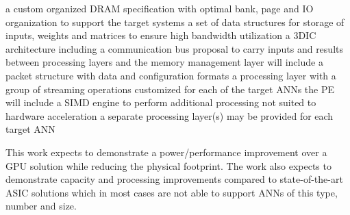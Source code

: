 \begin{outline}
\renewcommand{\outlinei}{enumerate}
  \vspace{-3mm}
  \1 a custom organized DRAM specification with optimal bank, page and IO organization to support the target systems
  \vspace{-3mm}
  \1 a set of data structures for storage of inputs, weights and matrices to ensure high bandwidth utilization
  \vspace{-3mm}
  \1 a 3DIC architecture including a communication bus proposal to carry inputs and results between processing layers and the memory management layer
    \vspace{-3mm}
    \2 will include a packet structure with data and configuration formats
   \vspace{-3mm}
   \1 a processing layer with a group of streaming operations customized for each of the target ANNs 
    \vspace{-8mm}
    \2 the PE will include a SIMD engine to perform additional processing not suited to hardware acceleration
    \vspace{-1mm}
    \2 a separate processing layer(s) may be provided for each target ANN
\end{outline}
\vspace{-2mm}
This work expects to demonstrate a \iffalse greater than \else \fi power/performance improvement over a GPU solution while \iffalse significantly \fi reducing
the physical footprint.
The work also expects to demonstrate \iffalse significant \fi capacity and processing improvements compared to state-of-the-art ASIC solutions
which in most cases are not able to support ANNs of this type, number and size.

